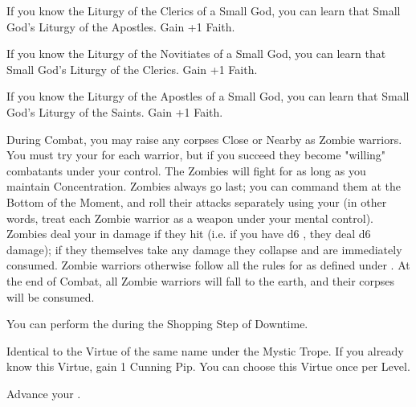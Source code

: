 \begin{multicols*}{2}
If you know the Liturgy of the Clerics of a Small God, you can learn that Small God's Liturgy of the Apostles. Gain +1 \MAX Faith.


If you know the Liturgy of the Novitiates of a Small God, you can learn that Small God's Liturgy of the Clerics. Gain +1 \MAX Faith.



If you know the Liturgy of the Apostles of a Small God, you can learn that Small God's Liturgy of the Saints. Gain +1 \MAX Faith.

\newpage


During Combat, you may raise any corpses Close or Nearby as Zombie warriors. You must try your \JUJU for each warrior, but if you succeed they become "willing" combatants under your control. The Zombies will fight for as long as you maintain Concentration. Zombies always go last; you can command them at the Bottom of the Moment, and roll their attacks separately using your \FOC (in other words, treat each Zombie warrior as a \FOC weapon under your mental control). Zombies deal your \JUJU in damage if they hit (i.e. if you have d6 \JUJU, they deal d6 damage); if they themselves take any damage they collapse and are immediately consumed. Zombie warriors otherwise follow all the rules for  as defined under .  At the end of Combat, all Zombie warriors will fall to the earth, and their corpses will be consumed. 


You can perform the  during the Shopping Step of Downtime. 



Identical to the Virtue of the same name under the Mystic Trope. If you already know this Virtue, gain 1 Cunning Pip. You can choose this Virtue once per Level.



Advance your \JUJU \DCUP.  




\end{multicols*}
